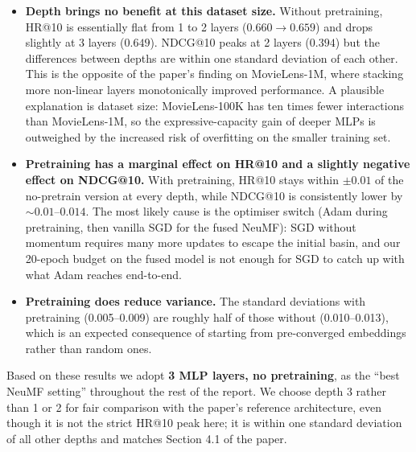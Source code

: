 \documentclass[11pt,a4paper]{article}
\newcommand{\inputtab}[1]{}
\begin{document}
\begin{itemize}
  \item \textbf{Depth brings no benefit at this dataset size.} Without
        pretraining, HR@10 is essentially flat from 1 to 2 layers
        ($0.660 \to 0.659$) and drops slightly at 3 layers ($0.649$).
        NDCG@10 peaks at 2 layers ($0.394$) but the differences between
        depths are within one standard deviation of each other. This is
        the opposite of the paper's finding on MovieLens-1M, where
        stacking more non-linear layers monotonically improved performance.
        A plausible explanation is dataset size: MovieLens-100K has
        ten times fewer interactions than MovieLens-1M, so the
        expressive-capacity gain of deeper MLPs is outweighed by the
        increased risk of overfitting on the smaller training set.
  \item \textbf{Pretraining has a marginal effect on HR@10 and a slightly
        negative effect on NDCG@10.} With pretraining, HR@10 stays within
        $\pm 0.01$ of the no-pretrain version at every depth, while
        NDCG@10 is consistently lower by $\sim\!0.01$--$0.014$. The most
        likely cause is the optimiser switch (Adam during pretraining,
        then vanilla SGD for the fused NeuMF): SGD without momentum
        requires many more updates to escape the initial basin, and our
        20-epoch budget on the fused model is not enough for SGD to
        catch up with what Adam reaches end-to-end.
  \item \textbf{Pretraining does reduce variance.} The standard
        deviations with pretraining (0.005--0.009) are roughly half of
        those without (0.010--0.013), which is an expected consequence of
        starting from pre-converged embeddings rather than random ones.
\end{itemize}

Based on these results we adopt \textbf{3 MLP layers, no pretraining},
as the ``best NeuMF setting'' throughout the rest of the report. We
choose depth 3 rather than 1 or 2 for fair comparison with the paper's
reference architecture, even though it is not the strict HR@10 peak here;
it is within one standard deviation of all other depths and matches
Section 4.1 of the paper.

\begin{table}[H]
  \centering
  \caption{NeuMF HR@10 and NDCG@10 vs.\ MLP depth (mean $\pm$ std, 10 seeds).}
  \label{tab:task02}
  \inputtab{tab_task02_mlp_layers}
\end{table}
\end{document}
